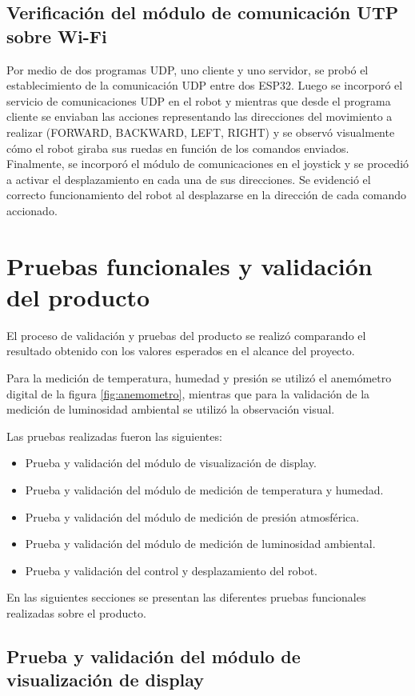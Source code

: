 \subsection{Verificación del módulo de comunicación UTP sobre Wi-Fi}
Por medio de dos programas UDP, uno cliente y uno servidor, se probó el establecimiento de la comunicación UDP entre dos ESP32. Luego se incorporó el servicio de comunicaciones UDP en el robot y mientras que desde el programa cliente se enviaban las acciones representando las direcciones del movimiento a realizar (FORWARD, BACKWARD, LEFT, RIGHT) y se observó visualmente cómo el robot giraba sus ruedas en función de los comandos enviados. Finalmente, se incorporó el módulo de comunicaciones en el joystick y se procedió a activar el desplazamiento en cada una de sus direcciones. Se evidenció el correcto funcionamiento del robot al desplazarse en la dirección de cada comando accionado.


\section{Pruebas funcionales y validación del producto}

El proceso de validación y pruebas del producto se realizó comparando el resultado obtenido con los valores esperados en el alcance del proyecto.

Para la medición de temperatura, humedad y presión se utilizó el anemómetro digital de la figura \ref{fig:anemometro}, mientras que para la validación de la medición de luminosidad ambiental se utilizó la observación visual.

Las pruebas realizadas fueron las siguientes:
\begin{itemize}
	\item Prueba y validación del módulo de visualización de display.
	\item Prueba y validación del módulo de medición de temperatura y humedad.
	\item Prueba y validación del módulo de medición de presión atmosférica.
	\item Prueba y validación del módulo de medición de luminosidad ambiental.
	\item Prueba y validación del control y desplazamiento del robot.
\end{itemize}

En las siguientes secciones se presentan las diferentes pruebas funcionales realizadas sobre el producto.


\subsection{Prueba y validación del módulo de visualización de display}

